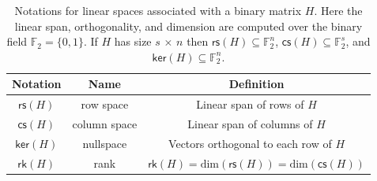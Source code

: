 \documentclass{article}
\newcommand{\FF}{\mathbb{F}}
\newcommand{\rs}[1]{\mathsf{rs}{(#1)}}
\newcommand{\cs}[1]{\mathsf{cs}{(#1)}}
\renewcommand{\ker}[1]{\mathsf{ker}{(#1)}}
\newcommand{\rk}[1]{\mathsf{rk}{(#1)}}
\begin{document}
\begin{table}[t]
\begin{center}
\begin{tabular}{c|c|c}
\hline
Notation & Name & Definition \\
\hline
\hline
$\rs{H}$ & row space & Linear span of rows of $H$ \\
\hline
$\cs{H}$ & column space & Linear span of columns of $H$\\
\hline
$\ker{H}$ & nullspace & Vectors orthogonal to each row of $H$\\
\hline
$\rk{H}$ & rank &  $\rk{H}=\mathrm{dim}(\rs{H})=\mathrm{dim}(\cs{H})$ \\
\hline
\end{tabular}
\caption{Notations for  linear spaces associated with a binary matrix $H$.
Here the linear span, orthogonality, and dimension are computed over the binary field
$\FF_2=\{0,1\}$.
If $H$ has size $s\,{\times}\, n$ then $\rs{H}\subseteq \FF_2^n$,
$\cs{H}\subseteq \FF_2^s$, and $\ker{H}\subseteq \FF_2^n$.
}
\end{center}
\end{table}
\end{document}
